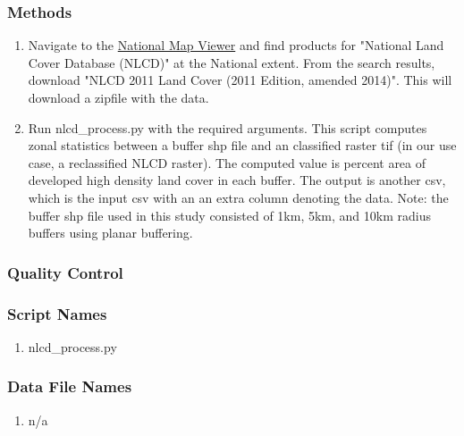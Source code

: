\subsubsection*{Methods}
\begin{enumerate}
\item Navigate to the \href{https://viewer.nationalmap.gov/basic/}{National Map Viewer} and find products for "National Land Cover Database (NLCD)" at the National extent. From the search results, download "NLCD 2011 Land Cover (2011 Edition, amended 2014)". This will download a zipfile with the data.
\item Run nlcd\_process.py with the required arguments. This script computes zonal statistics between a buffer shp file and an classified raster tif (in our use case, a reclassified NLCD raster). The computed value is percent area of developed high density land cover in each buffer. The output is another csv, which is the input csv with an an extra column denoting the data.
Note: the buffer shp file used in this study consisted of 1km, 5km, and 10km radius buffers using planar buffering.
\end{enumerate}
\subsubsection*{Quality Control}
\subsubsection*{Script Names}
\begin{enumerate}
\item nlcd\_process.py
\end{enumerate}
\subsubsection*{Data File Names}
\begin{enumerate}
\item n/a
\end{enumerate}
